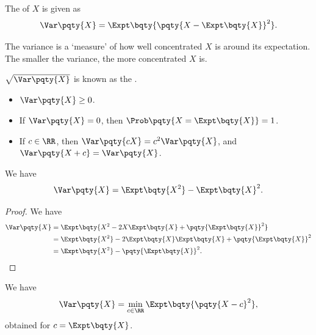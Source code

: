 \begin{definition}[Variance]
    \label{def:variance}%
    The  of \(X\) is given as
    \[
        \Var\pqty{X} = \Expt\bqty{\pqty{X - \Expt\bqty{X}}^2}.
    \]
\end{definition}

The variance is a `measure' of how well concentrated \(X\) is around its expectation. The smaller the variance, the more concentrated \(X\) is.

\begin{definition}
    \label{def:std-deviation}%
    \(\sqrt{\Var\pqty{X}}\) is known as the .
\end{definition}

\begin{proposition}
    \label{prop:properties-of-variance}%
    \begin{itemize}
        \item \(\Var\pqty{X} \geq 0\).
        \item If \(\Var\pqty{X} = 0\), then \(\Prob\pqty{X = \Expt\bqty{X}} = 1\).
        \item If \(c \in \RR\), then \(\Var\pqty{cX} = c^2 \Var\pqty{X}\), and \(\Var\pqty{X + c} = \Var\pqty{X}\).
    \end{itemize}
\end{proposition}

\begin{proposition}
    \label{prop:alt-formulation}%
    We have
    \[
        \Var\pqty{X} = \Expt\bqty{X^2} - \Expt\bqty{X}^2.
    \]
\end{proposition}

\begin{proof}
    We have
    \begin{align*}
        \Var\pqty{X} &= \Expt\bqty{X^2 - 2X \Expt\bqty{X} + \pqty{\Expt\bqty{X}}^2} \\
        &= \Expt\bqty{X^2} - 2 \Expt\bqty{X} \Expt\bqty{X} + \pqty{\Expt\bqty{X}}^2 \\
        &= \Expt\bqty{X^2} - \pqty{\Expt\bqty{X}}^2.
    \end{align*}
\end{proof}

\begin{proposition}
    \label{prop:variance-minimalisation}%
    We have
    \[
        \Var\pqty{X} = \min_{c \in \RR} \Expt\bqty{\pqty{X - c}^2},
    \]
    obtained for \(c = \Expt\bqty{X}\).
\end{proposition}

